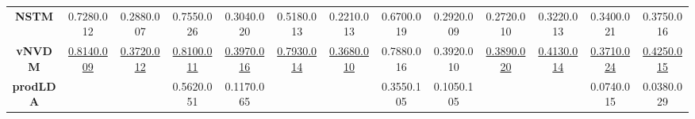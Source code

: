 \documentclass[11pt]{article}
\begin{document}
\begin{table*}[ ]
{\begin{tabular}{c|cccc|cccc|cccc|}
\textbf{NSTM}                                             & 0.7280.012                                                    & 0.2880.007                                                 & 0.7550.026                                                     & 0.3040.020                                                  & 0.5180.013                                                    & 0.2210.013                                                 & 0.6700.019                                                     & 0.2920.009                                                  & 0.2720.010                                                    & 0.3220.013                                                 & 0.3400.021                                                     & 0.3750.016                                                  \\
\textbf{vNVDM}                                             & \underline{0.8140.009   }                                                 & \underline{0.3720.012    }                                             & \underline{0.8100.011}                                                     & \underline{0.3970.016 }                                                 & \underline{0.7930.014 }                                                   & \underline{0.3680.010   }                                              & 0.7880.016                                                     & 0.3920.010                                                  & \underline{0.3890.020  }                                                  & \underline{0.4130.014  }                                               & \underline{0.3710.024 }                                                    & \underline{0.4250.015      }                                            \\
\textbf{prodLDA}                                            &                                                             &                                                          & 0.5620.051                                                     & 0.1170.065                                                  &                                                             &                                                          & 0.3550.105                                                     & 0.1050.105                                                  &                                                             &                                                          & 0.0740.015                                                     & 0.0380.029                                                  \\


\end{tabular}}
\end{table*}
\end{document}
